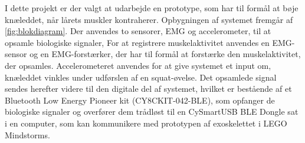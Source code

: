 I dette projekt er der valgt at udarbejde en prototype, som har til formål at bøje knæleddet, når lårets muskler kontraherer. Opbygningen af systemet fremgår af \autoref{fig:blokdiagram}. Der anvendes to sensorer, EMG og accelerometer, til at opsamle biologiske signaler, For at registrere muskelaktivitet anvendes en EMG-sensor og en EMG-forstærker, der har til formål at forstærke den muskelaktivitet, der opsamles. Accelerometeret anvendes for at give systemet et input om, knæleddet vinkles  under udførslen af en squat-øvelse. Det opsamlede signal sendes herefter videre til den digitale del af systemet, hvilket er bestående af et Bluetooth Low Energy Pioneer kit (CY8CKIT-042-BLE), som opfanger de biologiske signaler og overfører dem trådløst til en CySmartUSB BLE Dongle sat i en computer, som kan kommunikere med prototypen af exoskelettet i LEGO Mindstorms. 


